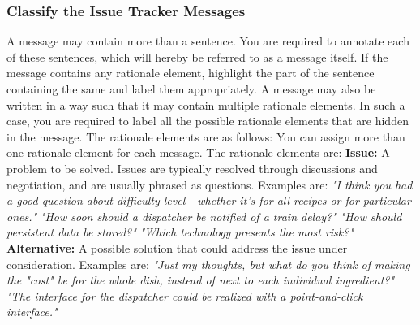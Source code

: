 \documentclass[a4paper,12pt,twoside]{report}
\begin{document}
\subsubsection{Classify the Issue Tracker Messages}
A message may contain more than a sentence. You are required to annotate each of these sentences, which will hereby be referred to as a message itself. If the message contains any rationale element, highlight the part of the sentence containing the same and label them appropriately. A message may also be written in a way such that it may contain multiple rationale elements. In such a case, you are required to label all the possible rationale elements that are hidden in the message. The rationale elements are as follows:
\newline \newline
You can assign more than one rationale element for each message. The rationale elements are: 
\newline \newline
\textbf{Issue:} A problem to be solved. Issues are typically resolved through discussions and negotiation, and are usually phrased as questions. Examples are:
\newline \newline
\textit{"I think you had a good question about difficulty level - whether it's for all recipes or for particular ones."}
\newline \newline
\textit{"How soon should a dispatcher be notified of a train delay?"}
\newline \newline
\textit{"How should persistent data be stored?"}
\newline \newline
\textit{"Which technology presents the most risk?"}
\newline \newline
\textbf{Alternative:} A possible solution that could address the issue under consideration. Examples are:
\newline \newline
\textit{"Just my thoughts, but what do you think of making the "cost" be for the whole dish, instead of next to each individual ingredient?"}
\newline \newline
\textit{"The interface for the dispatcher could be realized with a point-and-click interface."}
\newline \newline
\end{document}
